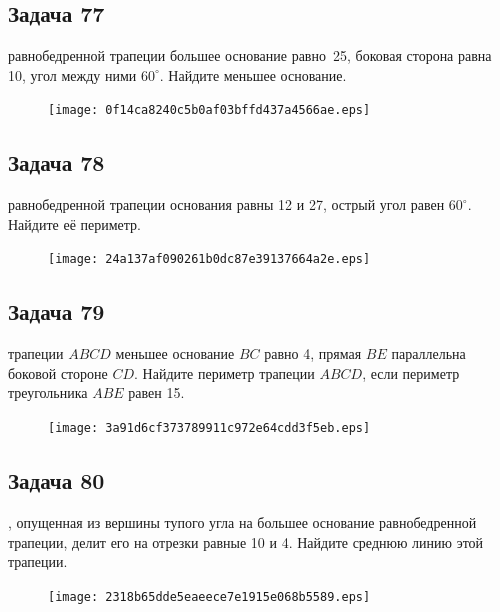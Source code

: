 \documentclass[a4paper,10pt]{article} %
\begin{document}
\begin{spacing}{1.0}
{\subsection*{Задача 77}
 равнобедренной трапеции большее основание равно~25, боковая сторона равна 10, угол между ними $60^\circ$. Найдите меньшее основание.

\vspace{1.5cm}

\begin{figure}{\texttt{[image: 0f14ca8240c5b0af03bffd437a4566ae.eps]}}\end{figure}
\subsection*{Задача 78}
 равнобедренной трапеции основания равны 12 и 27, острый угол равен $60^\circ$. Найдите её периметр.

\vspace{1.5cm}

\begin{figure}{\texttt{[image: 24a137af090261b0dc87e39137664a2e.eps]}}\end{figure}
\subsection*{Задача 79}
 трапеции $ABCD$ меньшее основание $BC$ равно 4, прямая $BE$ параллельна боковой стороне $CD$. Найдите периметр трапеции $ABCD$, если периметр треугольника $ABE$ равен 15.

\vspace{1.5cm}

\begin{figure}{\texttt{[image: 3a91d6cf373789911c972e64cdd3f5eb.eps]}}\end{figure}
\subsection*{Задача 80}
, опущенная из вершины тупого угла на большее основание равнобедренной трапеции, делит его на отрезки равные 10 и 4. Найдите среднюю линию этой трапеции.

\vspace{1.5cm}

\begin{figure}{\texttt{[image: 2318b65dde5eaeece7e1915e068b5589.eps]}}\end{figure}
}
\end{spacing}
\end{document}
